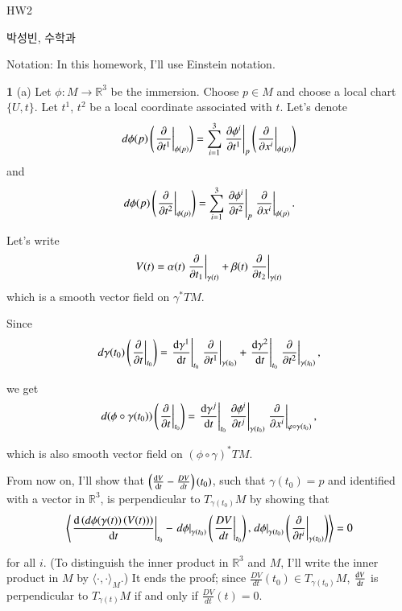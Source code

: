 \documentclass[a4paper, 12pt]{article}
\theoremstyle{Mydefinition}
\theoremstyle{Mytheorem}
\begin{document}
\thispagestyle{myfirstpage}
\begin{center}
    \Large{HW2}
\end{center}
박성빈, 수학과

Notation: In this homework, I'll use Einstein notation.

\noindent \textbf{1}
(a) Let $\phi:M\rightarrow \mathbb{R}^3$ be the immersion. Choose $p\in M$ and choose a local chart $\{U, t\}$. Let $t^1$, $t^2$ be a local coordinate associated with $t$. Let's denote $$d\phi(p)\left(\left.\pdv{t^1}\right|_{\phi(p)}\right) = \sum_{i=1}^3 \left.\pdv{\phi^i}{t^1}\right|_{p}\left(\left.\pdv{x^i}\right|_{\phi(p)}\right)$$ and $$d\phi(p)\left(\left.\pdv{t^2}\right|_{\phi(p)}\right) = \sum_{i=1}^3 \left.\pdv{\phi^i}{t^2}\right|_{p}\left.\pdv{x^i}\right|_{\phi(p)}.$$

Let's write $$V(t) = \alpha(t)\left.\pdv{t_1}\right|_{\gamma(t)} + \beta(t)\left.\pdv{t_2}\right|_{\gamma(t)}$$ which is a smooth vector field on $\gamma^*TM$.

Since $$d\gamma(t_0)\left(\left.\pdv{t}\right|_{t_0}\right) = \left.\dv{\gamma^1}{t}\right|_{t_0}\left.\pdv{t^1}\right|_{\gamma(t_0)} + \left.\dv{\gamma^2}{t}\right|_{t_0}\left.\pdv{t^2}\right|_{\gamma(t_0)},$$

we get $$d(\phi\circ \gamma(t_0))\left(\left.\pdv{t}\right|_{t_0}\right) = \left.\dv{\gamma^j}{t}\right|_{t_0}
\left.\pdv{\phi^i}{t^j}\right|_{\gamma(t_0)}\left.\pdv{x^i}\right|_{\varphi\circ\gamma(t_0)},$$

which is also smooth vector field on $(\phi\circ \gamma)^*TM$.

From now on, I'll show that $\left(\dv{V}{t}-\frac{DV}{dt}\right)(t_0)$, such that $\gamma(t_0) = p$ and identified with a vector in $\mathbb{R}^3$, is perpendicular to $T_{\gamma(t_0)}M$ by showing that
\begin{equation*}
    \left\langle \left.\dv{\left(d\phi(\gamma(t))\left(V(t)\right)\right)}{t}\right|_{t_0}- \left.d\phi\right|_{\gamma(t_0)}\left(\left.\frac{DV}{dt}\right|_{t_0}\right),  \left.d\phi\right|_{\gamma(t_0)}\left(\left.\pdv{t^i}\right|_{\gamma(t_0)}\right)\right\rangle = 0
\end{equation*}

for all $i$. (To distinguish the inner product in $\mathbb{R}^3$ and $M$, I'll write the inner product in $M$ by $\langle\cdot,\cdot\rangle_M$.) It ends the proof; since $\frac{DV}{dt}(t_0)\in T_{\gamma(t_0)}M$, $\dv{V}{t}(t)$ is perpendicular to $T_{\gamma(t)}M$ if and only if $\frac{DV}{dt}(t) = 0$.
\end{document}
